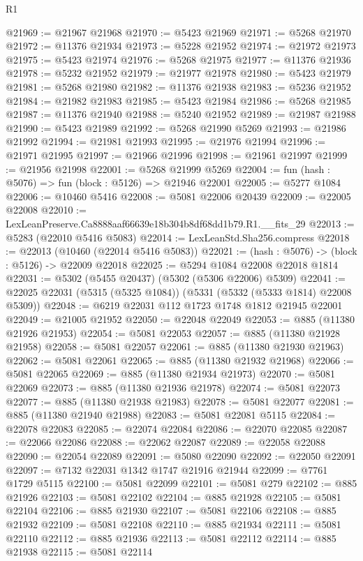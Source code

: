 \begin{lexlean}{R1}
\begin{coremodule}
@21969 := @21967 @21968
@21970 := @5423 @21969
@21971 := @5268 @21970
@21972 := @11376 @21934
@21973 := @5228 @21952
@21974 := @21972 @21973
@21975 := @5423 @21974
@21976 := @5268 @21975
@21977 := @11376 @21936
@21978 := @5232 @21952
@21979 := @21977 @21978
@21980 := @5423 @21979
@21981 := @5268 @21980
@21982 := @11376 @21938
@21983 := @5236 @21952
@21984 := @21982 @21983
@21985 := @5423 @21984
@21986 := @5268 @21985
@21987 := @11376 @21940
@21988 := @5240 @21952
@21989 := @21987 @21988
@21990 := @5423 @21989
@21992 := @5268 @21990 @5269
@21993 := @21986 @21992
@21994 := @21981 @21993
@21995 := @21976 @21994
@21996 := @21971 @21995
@21997 := @21966 @21996
@21998 := @21961 @21997
@21999 := @21956 @21998
@22001 := @5268 @21999 @5269
@22004 := fun (hash : @5076) => fun (block : @5126) => @21946 @22001
@22005 := @5277 @1084
@22006 := @10460 @5416
@22008 := @5081 @22006 @20439
@22009 := @22005 @22008
@22010 := LexLeanPreserve.Ca8888aaf66639e18b304b8df68dd1b79.R1.__fits_29
@22013 := @5283 (@22010 @5416 @5083)
@22014 := LexLeanStd.Sha256.compress
@22018 := @22013 (@10460 (@22014 @5416 @5083))
@22021 := (hash : @5076) -> (block : @5126) -> @22009 @22018
@22025 := @5294 @1084 @22008 @22018 @1814
@22031 := @5302 (@5455 @20437) (@5302 (@5306 @22006) @5309)
@22041 := @22025 @22031 (@5315 (@5325 @1084)) (@5331 (@5332 (@5333 @1814) @22008 @5309))
@22048 := @6219 @22031 @112 @1723 @1748 @1812 @21945 @22001
@22049 := @21005 @21952
@22050 := @22048 @22049
@22053 := @885 (@11380 @21926 @21953)
@22054 := @5081 @22053
@22057 := @885 (@11380 @21928 @21958)
@22058 := @5081 @22057
@22061 := @885 (@11380 @21930 @21963)
@22062 := @5081 @22061
@22065 := @885 (@11380 @21932 @21968)
@22066 := @5081 @22065
@22069 := @885 (@11380 @21934 @21973)
@22070 := @5081 @22069
@22073 := @885 (@11380 @21936 @21978)
@22074 := @5081 @22073
@22077 := @885 (@11380 @21938 @21983)
@22078 := @5081 @22077
@22081 := @885 (@11380 @21940 @21988)
@22083 := @5081 @22081 @5115
@22084 := @22078 @22083
@22085 := @22074 @22084
@22086 := @22070 @22085
@22087 := @22066 @22086
@22088 := @22062 @22087
@22089 := @22058 @22088
@22090 := @22054 @22089
@22091 := @5080 @22090
@22092 := @22050 @22091
@22097 := @7132 @22031 @1342 @1747 @21916 @21944
@22099 := @7761 @1729 @5115
@22100 := @5081 @22099
@22101 := @5081 @279
@22102 := @885 @21926
@22103 := @5081 @22102
@22104 := @885 @21928
@22105 := @5081 @22104
@22106 := @885 @21930
@22107 := @5081 @22106
@22108 := @885 @21932
@22109 := @5081 @22108
@22110 := @885 @21934
@22111 := @5081 @22110
@22112 := @885 @21936
@22113 := @5081 @22112
@22114 := @885 @21938
@22115 := @5081 @22114

\end{coremodule}
\end{lexlean}
